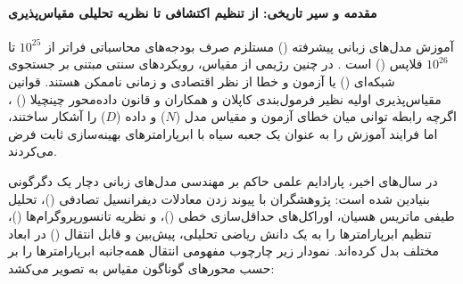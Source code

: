 \item {}

\paragraph*{مقدمه و سیر تاریخی: از تنظیم اکتشافی تا نظریه تحلیلی مقیاس‌پذیری}
آموزش مدل‌های زبانی پیشرفته () مستلزم صرف بودجه‌های محاسباتی فراتر از $10^{25}$ تا $10^{26}$ فلاپس () است \cite{shulgin2026lmo}. در چنین رژیمی از مقیاس، رویکردهای سنتی مبتنی بر جستجوی شبکه‌ای () یا آزمون و خطا از نظر اقتصادی و زمانی ناممکن هستند. قوانین مقیاس‌پذیری اولیه نظیر فرمول‌بندی کاپلان و همکاران \cite{kaplan2020scaling} و قانون داده‌محور چینچیلا () \cite{hoffmann2022chinchilla}، اگرچه رابطه توانی میان خطای آزمون و مقیاس مدل ($N$) و داده ($D$) را آشکار ساختند، اما فرایند آموزش را به عنوان یک جعبه سیاه با ابرپارامترهای بهینه‌سازی ثابت فرض می‌کردند. 

در سال‌های اخیر، پارادایم علمی حاکم بر مهندسی مدل‌های زبانی دچار یک دگرگونی بنیادین شده است: پژوهشگران با پیوند زدن معادلات دیفرانسیل تصادفی ()، تحلیل طیفی ماتریس هسیان، اوراکل‌های حداقل‌سازی خطی ()، و نظریه تانسورپروگرام‌ها ()، تنظیم ابرپارامترها را به یک دانش ریاضی تحلیلی، پیش‌بین و قابل انتقال () در ابعاد مختلف بدل کرده‌اند. نمودار زیر چارچوب مفهومی انتقال همه‌جانبه ابرپارامترها را بر حسب محورهای گوناگون مقیاس به تصویر می‌کشد:

